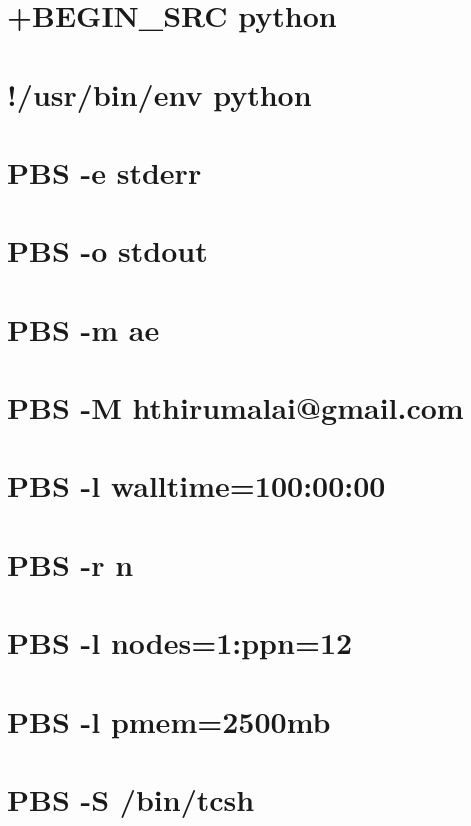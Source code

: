 \documentclass[11pt]{article}
\begin{document}
\section{+BEGIN\_SRC python}\label{begin_src-python-9}

\section{!/usr/bin/env python}\label{usrbinenv-python}

\section{PBS -e stderr}\label{pbs--e-stderr}

\section{PBS -o stdout}\label{pbs--o-stdout}

\section{PBS -m ae}\label{pbs--m-ae}

\section{PBS -M
hthirumalai@gmail.com}\label{pbs--m-hthirumalaigmail.com}

\section{PBS -l walltime=100:00:00}\label{pbs--l-walltime1000000}

\section{PBS -r n}\label{pbs--r-n}

\section{PBS -l nodes=1:ppn=12}\label{pbs--l-nodes1ppn12}

\section{PBS -l pmem=2500mb}\label{pbs--l-pmem2500mb}

\section{PBS -S /bin/tcsh}\label{pbs--s-bintcsh}
\end{document}
